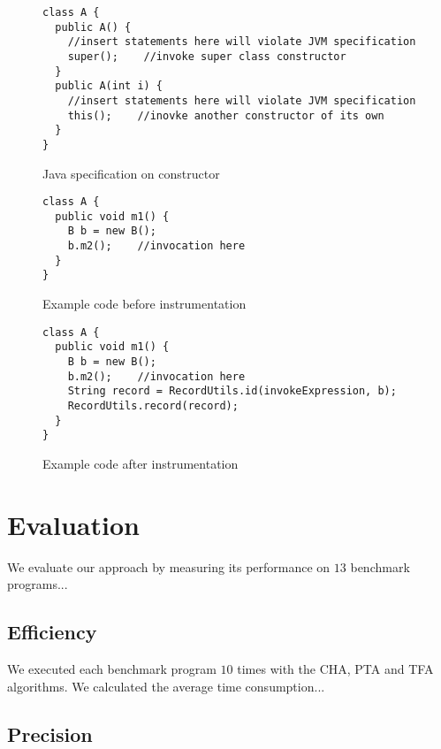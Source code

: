 \documentclass{fac}
\begin{document}
\begin{figure}
\begin{lstlisting}
class A {
  public A() {
    //insert statements here will violate JVM specification
    super();	//invoke super class constructor
  }
  public A(int i) {
    //insert statements here will violate JVM specification
    this();    //inovke another constructor of its own
  }
}
\end{lstlisting}
\caption{Java specification on constructor}
\label{fig:spec-constructor}
\end{figure}

\begin{figure}
\centering
\begin{lstlisting}
class A {
  public void m1() {
    B b = new B();
    b.m2();    //invocation here
  }
}
\end{lstlisting}
\caption{Example code before instrumentation}
\label{fig:before-instru}
\end{figure}

\begin{figure}
\begin{lstlisting}
class A {
  public void m1() {
    B b = new B();
    b.m2();    //invocation here
    String record = RecordUtils.id(invokeExpression, b);
    RecordUtils.record(record);
  }
}
\end{lstlisting}
\caption{Example code after instrumentation}
\label{fig:after-instru}
\end{figure}



\section{Evaluation}\label{sec:evaluation}
We evaluate our approach by measuring its performance on $13$ benchmark programs...
\subsection{Efficiency}\label{subsec:efficiency}
We executed each benchmark program $10$ times with the CHA, PTA and TFA algorithms. We calculated the average time consumption...
\subsection{Precision}\label{subsec:precision}
\end{document}
